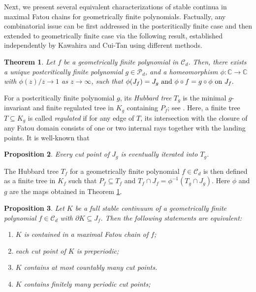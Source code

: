 \documentclass[a4paper,reqno,times, 11pt]{amsart}
\newtheorem{theorem}{Theorem}[section]
\newtheorem{proposition}[theorem]{Proposition}
\theoremstyle{remark}
\theoremstyle{plain}
\numberwithin{equation}{section}
\def\CCCC{\mathscr C}
\def\PPPP{\mathscr P}
\def\C{\mbox{$\mathbb C$}}
\begin{document}
	
	
	
	Next, we present several equivalent characterizations of   stable continua  in  maximal Fatou chains for geometrically finite polynomials.
	Factually, any combinatorial issue can be  first addressed in the postcritically finite case and then extended to geometrically finite case via the following result, established independently by Kawahira \cite{Ka} and Cui-Tan \cite{CT2} using different methods.
	
	\begin{theorem}\label{thm:CT}
		Let $f$ be a geometrically finite polynomial in $\CCCC_d$. Then, there exists a unique postcritically finite polynomial $g\in\PPPP_d$, and a homeomorphism $\phi:\C\to\C$ with $\phi(z)/z\to 1$ as $z\to\infty$, such that $\phi(J_f)=J_g\textup{ and }\phi\circ f=g\circ \phi\textup{ on }J_f.$
	\end{theorem}
	
	For a  postcritically finite polynomial $g$, its {\it Hubbard tree} $T_g$  is the minimal $g$-invariant and finite regulated tree in $K_g$ containing $P_f$; see  \cite[Proposition 2.7]{DH1}. Here, a finite tree $T\subseteq K_g$ is called \emph{regulated} if for any edge of $T$, its intersection with the closure of any Fatou domain consists of one or two internal rays together with the landing points. It is well-known that
\begin{proposition}\label{pro:iterate}
Every cut point of $J_g$ is eventually iterated into $T_g$.
\end{proposition}
	The Hubbard tree $T_f$ for a geometrically finite polynomial $f\in\CCCC_d$ is then defined as a finite tree in $K_f$ such that $P_f\subseteq T_f$ and $T_f\cap J_f=\phi^{-1}(T_g\cap J_g)$. Here $\phi$ and $g$ are the maps obtained in Theorem \ref{thm:CT}.
	
	\begin{proposition}\label{pro:cluster}
		Let $K$ be a full stable continuum of  a geometrically finite polynomial $f\in\CCCC_d$ with $\partial K\subseteq J_f$. Then the following statements are equivalent:
		\begin{enumerate}
			\item $K$ is contained in a maximal Fatou chain of $f$;
			\item each cut point of $K$ is preperiodic;
			\item $K$ contains at most countably many cut points.
						\item $K$ contains finitely many periodic cut points;
			
		\end{enumerate}
	\end{proposition}
	
\end{document}
